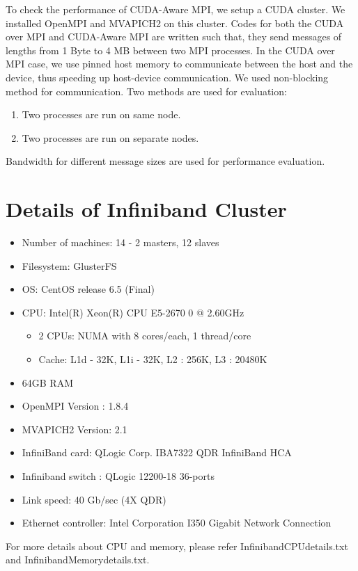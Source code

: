 \documentclass[10pt]{article}
\begin{document}
To check the performance of CUDA-Aware MPI, we setup a CUDA cluster. We installed OpenMPI and MVAPICH2 on this cluster. Codes for both the CUDA over MPI and CUDA-Aware MPI are written such that, they send messages of lengths from 1 Byte to 4 MB between two MPI processes. In the CUDA over MPI case, we use  pinned host memory to communicate between the host and the device, thus speeding up host-device communication. We used non-blocking method for communication. 
Two methods are used for evaluation:
\begin{enumerate}
\item Two processes are run on same node.
\item Two processes are run on separate nodes.
\end{enumerate}  
Bandwidth for different message sizes are used for performance  evaluation.

\section{Details of Infiniband Cluster}
\begin{itemize}
\item Number of machines: 14 -  2 masters, 12 slaves
\item Filesystem: GlusterFS
\item OS: CentOS release 6.5 (Final)
\item CPU: Intel(R) Xeon(R) CPU E5-2670 0 @ 2.60GHz
\begin{itemize}
\item 2 CPUs: NUMA with 8 cores/each, 1 thread/core
\item Cache: L1d - 32K, L1i - 32K, L2 : 256K, L3 : 20480K
\end{itemize}
\item 64GB RAM
\item OpenMPI Version : 1.8.4
\item MVAPICH2 Version: 2.1
\item InfiniBand card: QLogic Corp. IBA7322 QDR InfiniBand HCA
\item Infiniband switch : QLogic 12200-18 36-ports
\item Link speed: 40 Gb/sec (4X QDR)
\item Ethernet controller: Intel Corporation I350 Gigabit Network Connection
\end{itemize}
For more details about CPU and memory, please refer Infiniband\textunderscore CPU\textunderscore details.txt and Infiniband\textunderscore Memory\textunderscore details.txt.
\end{document}
